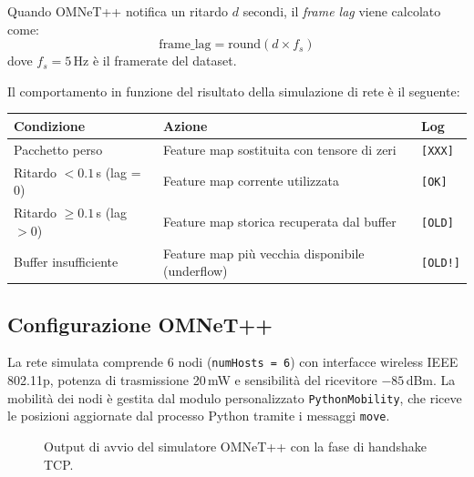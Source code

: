 \documentclass[12pt,a4paper]{article}
\begin{document}
Quando OMNeT++ notifica un ritardo $d$ secondi, il \textit{frame lag} viene calcolato come:
\begin{equation}
  \text{frame\_lag} = \text{round}\!\left(d \times f_s\right)
\end{equation}
dove $f_s = 5\,\text{Hz}$ \`e il framerate del dataset.

Il comportamento in funzione del risultato della simulazione di rete \`e il seguente:

\begin{center}
\begin{tabular}{@{}lll@{}}
  \toprule
  Condizione & Azione & Log \\
  \midrule
  Pacchetto perso & Feature map sostituita con tensore di zeri & \texttt{[XXX]} \\
  Ritardo $< 0.1$\,s (lag = 0) & Feature map corrente utilizzata & \texttt{[OK]} \\
  Ritardo $\ge 0.1$\,s (lag $> 0$) & Feature map storica recuperata dal buffer & \texttt{[OLD]} \\
  Buffer insufficiente & Feature map pi\`u vecchia disponibile (underflow) & \texttt{[OLD!]} \\
  \bottomrule
\end{tabular}
\end{center}

\subsection{Configurazione OMNeT++}

La rete simulata comprende 6 nodi (\texttt{numHosts = 6}) con interfacce wireless IEEE 802.11p,
potenza di trasmissione 20\,mW e sensibilit\`a del ricevitore $-85$\,dBm. La mobilit\`a dei
nodi \`e gestita dal modulo personalizzato \texttt{PythonMobility}, che riceve le posizioni
aggiornate dal processo Python tramite i messaggi \texttt{move}.

\begin{figure}[H]
  \centering
  \caption{Output di avvio del simulatore OMNeT++ con la fase di handshake TCP.}
  \label{fig:omnet_startup}
\end{figure}
\end{document}

